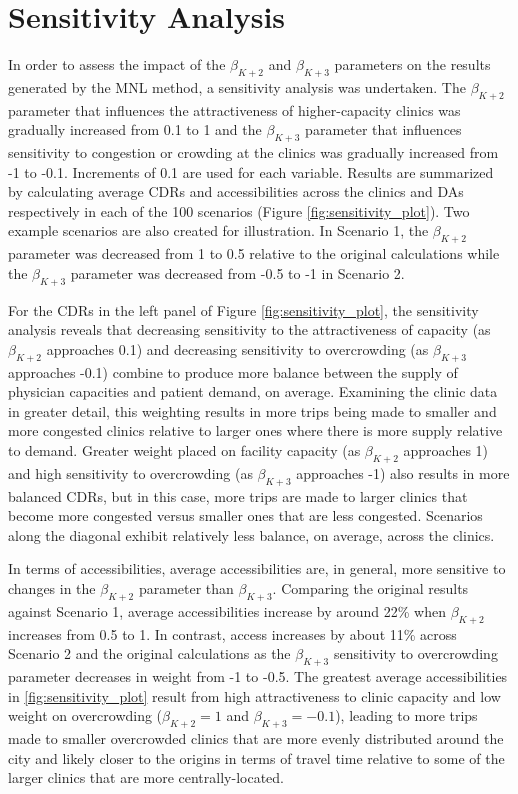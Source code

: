 \documentclass[]{elsarticle} %
\begin{document}
\hypertarget{sensitivity-analysis}{%
\section{Sensitivity Analysis}\label{sensitivity-analysis}}

In order to assess the impact of the \(\beta_{K+2}\) and
\(\beta_{K + 3}\) parameters on the results generated by the MNL method,
a sensitivity analysis was undertaken. The \(\beta_{K+2}\) parameter
that influences the attractiveness of higher-capacity clinics was
gradually increased from 0.1 to 1 and the \(\beta_{K + 3}\) parameter
that influences sensitivity to congestion or crowding at the clinics was
gradually increased from -1 to -0.1. Increments of 0.1 are used for each
variable. Results are summarized by calculating average CDRs and
accessibilities across the clinics and DAs respectively in each of the
100 scenarios (Figure \ref{fig:sensitivity_plot}). Two example scenarios
are also created for illustration. In Scenario 1, the \(\beta_{K+2}\)
parameter was decreased from 1 to 0.5 relative to the original
calculations while the \(\beta_{K + 3}\) parameter was decreased from
-0.5 to -1 in Scenario 2.

For the CDRs in the left panel of Figure \ref{fig:sensitivity_plot}, the
sensitivity analysis reveals that decreasing sensitivity to the
attractiveness of capacity (as \(\beta_{K+2}\) approaches 0.1) and
decreasing sensitivity to overcrowding (as \(\beta_{K+3}\) approaches
-0.1) combine to produce more balance between the supply of physician
capacities and patient demand, on average. Examining the clinic data in
greater detail, this weighting results in more trips being made to
smaller and more congested clinics relative to larger ones where there
is more supply relative to demand. Greater weight placed on facility
capacity (as \(\beta_{K+2}\) approaches 1) and high sensitivity to
overcrowding (as \(\beta_{K+3}\) approaches -1) also results in more
balanced CDRs, but in this case, more trips are made to larger clinics
that become more congested versus smaller ones that are less congested.
Scenarios along the diagonal exhibit relatively less balance, on
average, across the clinics.

In terms of accessibilities, average accessibilities are, in general,
more sensitive to changes in the \(\beta_{K+2}\) parameter than
\(\beta_{K+3}\). Comparing the original results against Scenario 1,
average accessibilities increase by around 22\% when \(\beta_{K+2}\)
increases from 0.5 to 1. In contrast, access increases by about 11\%
across Scenario 2 and the original calculations as the \(\beta_{K+3}\)
sensitivity to overcrowding parameter decreases in weight from -1 to
-0.5. The greatest average accessibilities in \ref{fig:sensitivity_plot}
result from high attractiveness to clinic capacity and low weight on
overcrowding (\(\beta_{K+2} = 1\) and \(\beta_{K+3} = -0.1\)), leading
to more trips made to smaller overcrowded clinics that are more evenly
distributed around the city and likely closer to the origins in terms of
travel time relative to some of the larger clinics that are more
centrally-located.
\end{document}
